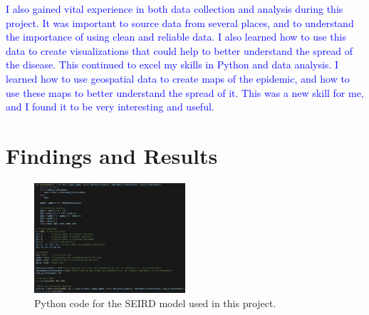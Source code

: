 \documentclass[%
 reprint,
superscriptaddress,
 amsmath,amssymb,
 aps,
floatfix,
]{revtex4-2}
\begin{document}
\textcolor{blue}{
    I also gained vital experience in both data collection and analysis during this project. 
    It was important to source data from several places, and to understand the importance of using clean and reliable data. 
    I also learned how to use this data to create visualizations that could help to better understand the spread of the disease. 
    This continued to excel my skills in Python and data analysis.
    I learned how to use geospatial data to create maps of the epidemic, and how to use these maps to better understand the spread of it. 
    This was a new skill for me, and I found it to be very interesting and useful.}

\section{Findings and Results}

\begin{figure}[t]
    \centering
    \includegraphics[width=0.5\textwidth]{SEIRD Model.png}
    \caption{Python code for the SEIRD model used in this project.}
    \label{SEIRD Model}
\end{figure}
\end{document}
